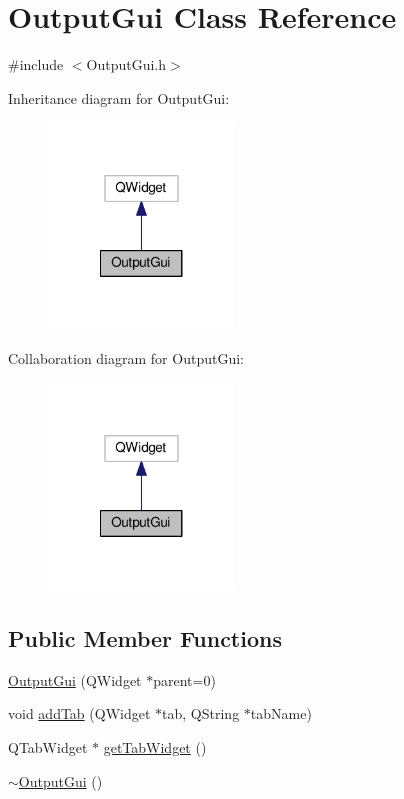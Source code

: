 \hypertarget{class_output_gui}{\section{Output\-Gui Class Reference}
\label{class_output_gui}
}


{\ttfamily \#include $<$Output\-Gui.\-h$>$}



Inheritance diagram for Output\-Gui\-:\nopagebreak
\begin{figure}[H]
\begin{center}
\leavevmode
\includegraphics[width=140pt]{class_output_gui__inherit__graph}
\end{center}
\end{figure}


Collaboration diagram for Output\-Gui\-:\nopagebreak
\begin{figure}[H]
\begin{center}
\leavevmode
\includegraphics[width=140pt]{class_output_gui__coll__graph}
\end{center}
\end{figure}
\subsection*{Public Member Functions}
\begin{DoxyCompactItemize}
\item 
\hyperlink{class_output_gui_a6442997196cceca74c0a79ddb9763d2c}{Output\-Gui} (Q\-Widget $\ast$parent=0)
\item 
void \hyperlink{class_output_gui_ad28c34939968c81bdba5e7edcd94fde2}{add\-Tab} (Q\-Widget $\ast$tab, Q\-String $\ast$tab\-Name)
\item 
Q\-Tab\-Widget $\ast$ \hyperlink{class_output_gui_acd5d7658edaa37f392fbb2524cb5cd05}{get\-Tab\-Widget} ()
\item 
\hyperlink{class_output_gui_a5b18318b0cf8ebb4118ce9197f80ea49}{$\sim$\-Output\-Gui} ()
\end{DoxyCompactItemize}

